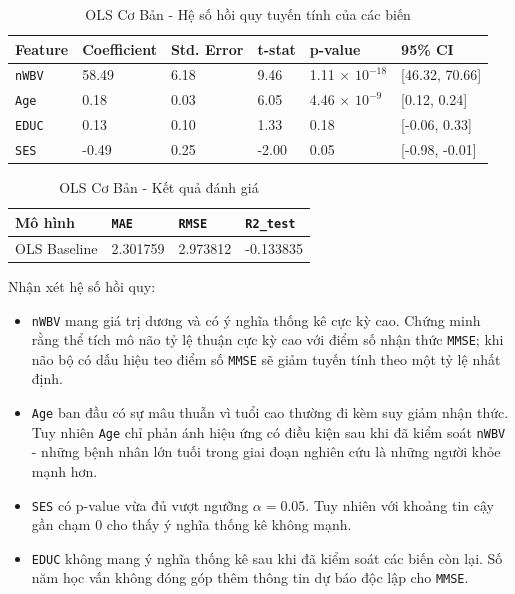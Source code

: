 \begin{table}[H]
    \centering
    \renewcommand{\arraystretch}{1.3}
    \setlength{\tabcolsep}{6pt}
    \begin{tabular}{|p{2cm}|p{2.25cm}|p{2.5cm}|p{1.8cm}|p{2.2cm}|p{3.2cm}|}
        \hline
        \rowcolor[rgb]{0.8, 0.9, 1.0}
        \textbf{Feature} & \textbf{Coefficient} & \textbf{Std. Error} & \textbf{t-stat} & \textbf{p-value} & \textbf{95\% CI} \\ \hline
        \texttt{nWBV} & 58.49 & 6.18 & 9.46 & 1.11 $\times$ $10^{-18}$ & [46.32, 70.66] \\ \hline
        \texttt{Age} & 0.18 & 0.03 & 6.05 & 4.46 $\times$ $10^{-9}$ & [0.12, 0.24] \\ \hline
        \texttt{EDUC} & 0.13 & 0.10 & 1.33 & 0.18 & [-0.06, 0.33] \\ \hline
        \texttt{SES} & -0.49 & 0.25 & -2.00 & 0.05 & [-0.98, -0.01] \\ \hline
    \end{tabular}
    \caption{OLS Cơ Bản - Hệ số hồi quy tuyến tính của các biến}
\end{table}

\begin{table}[H]
    \centering
    \renewcommand{\arraystretch}{1.3}
    \setlength{\tabcolsep}{10pt}
    \begin{tabular}{|p{3cm}|p{2.5cm}|p{2.5cm}|p{2.5cm}|}
        \hline
        \rowcolor[rgb]{0.8, 0.9, 1.0}
        \textbf{Mô hình} & \textbf{\texttt{MAE}} & \textbf{\texttt{RMSE}} & \textbf{\texttt{R2\_test}} \\ \hline
        OLS Baseline & 2.301759 & 2.973812 & -0.133835 \\ \hline
    \end{tabular}
    \caption{OLS Cơ Bản - Kết quả đánh giá}
\end{table}

Nhận xét hệ số hồi quy:

\begin{itemize}[topsep=0pt, itemsep=2.5pt, leftmargin=1.5cm]
    \item \texttt{nWBV} mang giá trị dương và có ý nghĩa thống kê cực kỳ cao. Chứng minh rằng thể tích mô não tỷ lệ thuận cực kỳ cao với điểm số nhận thức \texttt{MMSE}; khi não bộ có dấu hiệu teo điểm số \texttt{MMSE} sẽ giảm tuyến tính theo một tỷ lệ nhất định.
    \item \texttt{Age} ban đầu có sự mâu thuẫn vì tuổi cao thường đi kèm suy giảm nhận thức. Tuy nhiên \texttt{Age} chỉ phản ánh hiệu ứng có điều kiện sau khi đã kiểm soát \texttt{nWBV} - những bệnh nhân lớn tuối trong giai đoạn nghiên cứu là những người khỏe mạnh hơn.
    \item \texttt{SES} có p-value vừa đủ vượt ngưỡng $\alpha = 0.05$. Tuy nhiên với khoảng tin cậy gần chạm 0 cho thấy ý nghĩa thống kê không mạnh.
    \item \texttt{EDUC} không mang ý nghĩa thống kê sau khi đã kiểm soát các biến còn lại. Số năm học vấn không đóng góp thêm thông tin dự báo độc lập cho \texttt{MMSE}.
\end{itemize}

